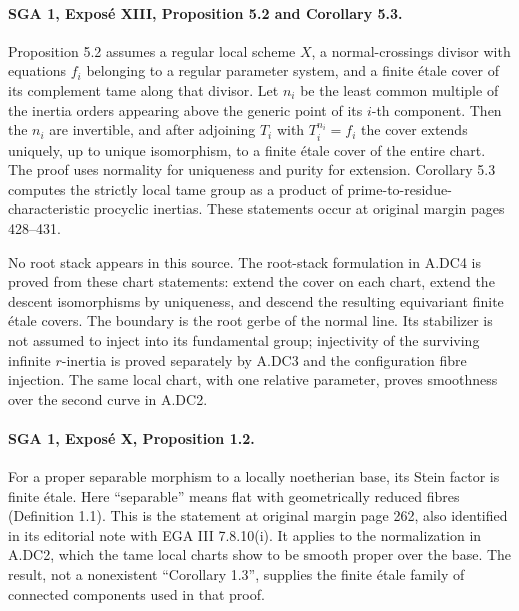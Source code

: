 \paragraph{SGA 1, Expos\'e XIII, Proposition 5.2 and Corollary 5.3.}
Proposition 5.2 assumes a regular local scheme $X$, a normal-crossings
divisor with equations $f_i$ belonging to a regular parameter system,
and a finite \'etale cover of its complement tame along that divisor.
Let $n_i$ be the least common multiple of the inertia orders appearing
above the generic point of its $i$-th component. Then the $n_i$ are
invertible, and after adjoining $T_i$ with $T_i^{n_i}=f_i$ the cover
extends uniquely, up to unique isomorphism, to a finite \'etale cover
of the entire chart. The proof uses normality for uniqueness and
purity for extension. Corollary 5.3 computes the strictly local tame
group as a product of prime-to-residue-characteristic procyclic
inertias. These statements occur at original margin pages 428--431.

No root stack appears in this source. The root-stack formulation in
A.DC4 is proved from these chart statements: extend the cover on
each chart, extend the descent isomorphisms by uniqueness, and descend
the resulting equivariant finite \'etale covers. The boundary is the
root gerbe of the normal line. Its stabilizer is not assumed to inject
into its fundamental group; injectivity of the surviving infinite
$r$-inertia is proved separately by A.DC3 and the configuration fibre
injection. The same local chart, with one relative parameter, proves
smoothness over the second curve in A.DC2.

\paragraph{SGA 1, Expos\'e X, Proposition 1.2.}
For a proper separable morphism to a locally noetherian base, its Stein
factor is finite \'etale. Here ``separable'' means flat with
geometrically reduced fibres (Definition 1.1). This is the statement
at original margin page 262, also identified in its editorial note
with EGA III 7.8.10(i). It applies to the normalization in A.DC2,
which the tame local charts show to be smooth proper over the base.
The result, not a nonexistent ``Corollary 1.3'', supplies the finite
\'etale family of connected components used in that proof.

